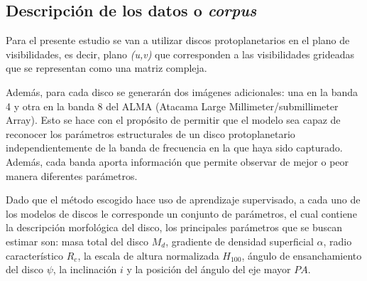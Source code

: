 \subsection{Descripción de los datos o \textit{corpus}}

Para el presente estudio se van a utilizar discos protoplanetarios en el plano de visibilidades, es decir, plano \textit{(u,v)} que corresponden a las visibilidades grideadas que se representan como una matriz compleja. 

Además, para cada disco se generarán dos imágenes adicionales: una en la banda 4 y otra en la banda 8 del ALMA (Atacama Large Millimeter/submillimeter Array). Esto se hace con el propósito de permitir que el modelo sea capaz de reconocer los parámetros estructurales de un disco protoplanetario independientemente de la banda de frecuencia en la que haya sido capturado. Además, cada banda aporta información que permite observar de mejor o peor manera diferentes parámetros.

Dado que el método escogido hace uso de aprendizaje supervisado, a cada uno de los modelos de discos le corresponde un conjunto de parámetros, el cual contiene la descripción morfológica del disco, los principales parámetros que se buscan estimar son: masa total del disco $M_{d}$, gradiente de densidad superficial $\alpha$, radio característico $R_{c}$, la escala de altura normalizada $H_{100}$, ángulo de ensanchamiento del disco $\psi$, la inclinación $i$ y la posición del ángulo del eje mayor $PA$.
